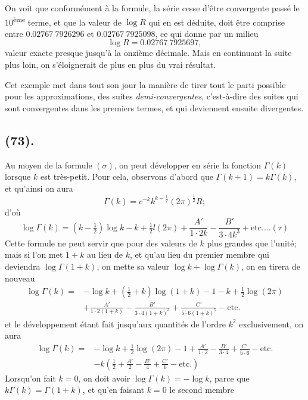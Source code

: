 \documentclass{article}
\begin{document}

On voit que conformément à la formule, la série cesse d'être convergente passé le 10\textsuperscript{ème} terme, et que la valeur de $\log R$ qui en est déduite, doit être comprise entre $0.02767\ 7926296$ et $0.02767\ 7925098$, ce qui donne par un milieu
\[ \log R=0.02767\ 7925697, \]
valeur exacte presque jusqu'à la onzième décimale. Mais en continuant la suite plus loin, on s'éloignerait de plus en plus du vrai résultat.

Cet exemple met dans tout son jour la manière de tirer tout le parti possible pour les approximations, des suites \emph{demi-convergentes}, c'est-à-dire des suites qui sont convergentes dans les premiers termes, et qui deviennent ensuite divergentes.

\subsection*{(73).}

Au moyen de la formule $(\sigma)$, on peut développer en série la fonction $\Gamma(k)$ lorsque $k$ est très-petit. Pour cela, observons d'abord que $\Gamma(k+1)=k\Gamma(k)$, et qu'ainsi on aura
\[ \Gamma(k)=c^{-k}k^{k-\frac{1}{2}}(2\pi)^{\frac{1}{2}}R; \]
d'où
\[ \log\Gamma(k)=(k-\tfrac{1}{2})\log k-k+\tfrac{1}{2}l(2\pi)+\frac{A'}{1\cdot2k}-\frac{B'}{3\cdot4k^{3}}+\text{etc.}\ldots(\tau) \]
Cette formule ne peut servir que pour des valeurs de $k$ plus grandes que l'unité; mais si l'on met $1+k$ au lieu de $k$, et qu'au lieu du premier membre qui deviendra $\log\Gamma(1+k)$, on mette sa valeur $\log k+\log\Gamma(k)$, on en tirera de nouveau
\[ \begin{aligned} \log\Gamma(k)={}&-\log k+(\tfrac{1}{2}+k)\log(1+k)-1-k+\tfrac{1}{2}\log(2\pi)\\ &+\frac{A'}{1\cdot2(1+k)}-\frac{B'}{3\cdot4(1+k)^{3}}+\frac{C'}{5\cdot6(1+k)^{5}}-\text{etc.} \end{aligned} \]
et le développement étant fait jusqu'aux quantités de l'ordre $k^{2}$ exclusivement, on aura
\[ \begin{aligned} \log\Gamma(k)={}&-\log k+\tfrac{1}{2}\log(2\pi)-1+\frac{A'}{1\cdot2}-\frac{B'}{3\cdot4}+\frac{C'}{5\cdot6}-\text{etc.}\\ &-k\left(\tfrac{1}{2}+\frac{A'}{2}-\frac{B'}{4}+\frac{C'}{6}-\text{etc.}\right) \end{aligned} \]
Lorsqu'on fait $k=0$, on doit avoir $\log\Gamma(k)=-\log k$, parce que $k\Gamma(k)=\Gamma(1+k)$, et qu'en faisant $k=0$ le second membre
\end{document}
